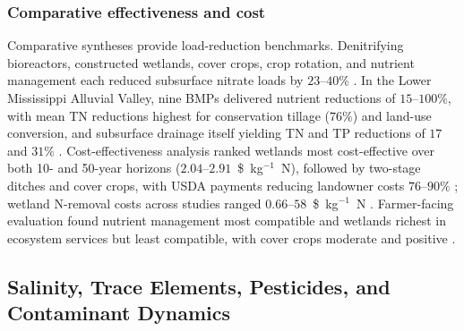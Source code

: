\documentclass[11pt]{article}
\begin{document}
\subsubsection{Comparative effectiveness and cost}

Comparative syntheses provide load-reduction benchmarks. Denitrifying
bioreactors, constructed wetlands, cover crops, crop rotation, and nutrient
management each reduced subsurface nitrate loads by $23$--$40\%$
\parencite{Yuan2022}. In the Lower Mississippi Alluvial Valley, nine BMPs
delivered nutrient reductions of $15$--$100\%$, with mean TN reductions
highest for conservation tillage ($76\%$) and land-use conversion, and
subsurface drainage itself yielding TN and TP reductions of $17$ and $31\%$
\parencite{Kröger2012}. Cost-effectiveness analysis ranked wetlands most
cost-effective over both 10- and 50-year horizons ($2.04$--$2.91$~\$~kg$^{-1}$~N),
followed by two-stage ditches and cover crops, with USDA payments reducing
landowner costs $76$--$90\%$ \parencite{Roley2016}; wetland N-removal costs
across studies ranged $0.66$--$58$~\$~kg$^{-1}$~N \parencite{Messer2021}.
Farmer-facing evaluation found nutrient management most compatible and
wetlands richest in ecosystem services but least compatible, with cover
crops moderate and positive \parencite{Christianson2014}.

\subsection{Salinity, Trace Elements, Pesticides, and Contaminant Dynamics}
\end{document}
